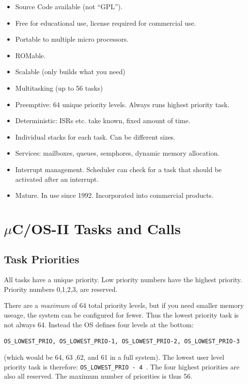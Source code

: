 \documentclass{article}	%
\begin{document}
\begin{itemize}
  \item Source Code available (not ``GPL'').
  \item Free for educational use, license required
  for commercial use.
  \item Portable to multiple micro processors.
  \item ROMable.
  \item Scalable (only builds what you need)
  \item Multitasking (up to 56 tasks)
  \item Preemptive:  64 unique priority levels.
  Always runs highest priority task.
  \item Deterministic:  ISRs etc. take known,
  fixed amount of time.
  \item Individual stacks for each task. Can
  be different sizes.
  \item Services:  mailboxes, queues, semphores,
  dynamic memory allocation.
  \item Interrupt management.  Scheduler can
  check for a task that should be activated after an
  interrupt.
  \item Mature.  In use since 1992.  Incorporated
  into commercial products.
\end{itemize}



\section{$\mu$C/OS-II   Tasks and Calls}

\subsection{Task Priorities}

All tasks have a unique priority.	%
Low priority numbers
have the  highest priority.
Priority numbers 0,1,2,3, are reserved.

There are a
{\it maximum } of 64 total priority levels, but if you need
smaller memory useage, the system can be configured for
fewer.  Thus the lowest priority task is not always 64. Instead
the OS defines four levels at the bottom:

{\tt OS\_LOWEST\_PRIO, OS\_LOWEST\_PRIO-1, OS\_LOWEST\_PRIO-2, OS\_LOWEST\_PRIO-3 }

(which would be 64, 63 ,62, and 61 in a full system).  The lowest user level priority task is therefore:
{\tt OS\_LOWEST\_PRIO - 4 }.   The four
highest priorities are also
all reserved.
The maximum number of priorities
is thus 56.
\end{document}

